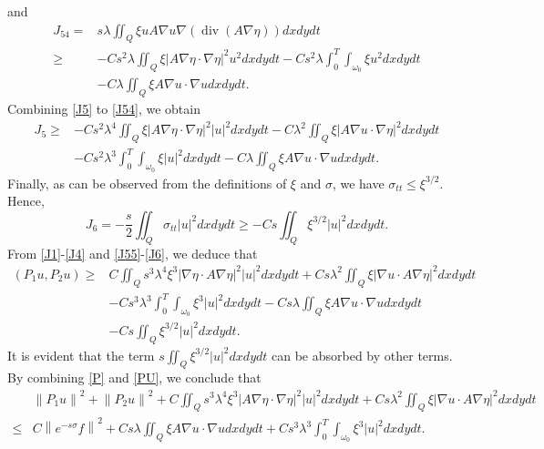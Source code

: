 \documentclass[9pt,reqno]{amsart}
\theoremstyle{plain}
\numberwithin{equation}{section}
\numberwithin{theorem}{section}
\DeclareMathOperator*{\Div}{\mathrm{div}}
\begin{document}
	and
	\begin{equation}\label{J54}
		\begin{split}
			J_{54}=&s \lambda \iint_Q \xi u A \nabla u \nabla(\Div(A \nabla \eta))dx dy d t\\
			\ge&
			-C s^2 \lambda \iint_Q \xi \left|A \nabla \eta \cdot \nabla \eta\right|^2 u^2dx dy d t-C s^2 \lambda \int_0^T \int_{\omega_0}\xi  u^2dx dy d t\\
			&-C \lambda \iint_Q \xi A \nabla u \cdot \nabla udx dy d t.
		\end{split}
	\end{equation}
	Combining \eqref{J5} to \eqref{J54}, we obtain
	\begin{equation}\label{J55}
		\begin{split}
			J_5 \geq&-Cs^2 \lambda^4 \iint_Q \xi\left|A \nabla \eta \cdot \nabla \eta\right|^2 |u|^2dx dy d t -C\lambda^2\iint_{Q} \xi \left| A\nabla u\cdot \nabla \eta \right| ^2 dx dy dt\\
			&-C s^2 \lambda^3 \int_0^T \int_{\omega_0} \xi|u|^2dx dy d t- C\lambda \iint_Q  \xi A \nabla u \cdot \nabla u dx dy d t.
		\end{split}
	\end{equation}
	Finally, as can be observed from the definitions of $\xi$ and $\sigma$, we have $\sigma_{tt} \le \xi^{3/2}$. Hence,
	\begin{equation}\label{J6}
		J_6 =-\frac{s}{2} \iint_Q \sigma_{t t}|u|^2dx dy d t \geq-C s \iint_Q \xi^{3 / 2}|u|^2dx dy d t.
	\end{equation}
	From \eqref{J1}-\eqref{J4} and \eqref{J55}-\eqref{J6}, we deduce that
	\begin{equation}\label{PU}
		\begin{split}
			\left(P_1 u, P_2 u\right)
			\geq& C\iint_Q s^3 \lambda^4 \xi^3 |\nabla \eta \cdot A \nabla \eta|^2 |u|^2 dx dydt  + C s  \lambda^2 \iint_Q\xi|\nabla u \cdot A \nabla \eta|^2 dx dy d t\\
			&-Cs^3 \lambda^3 \int_0^T \int_{\omega_0} \xi^3|u|^2dx dy d t
			- Cs \lambda \iint_Q \xi A \nabla u \cdot \nabla udx dy d t\\
			&- Cs \iint_Q \xi^{3 / 2}|u|^2dx dy d t.
		\end{split}
	\end{equation}
	It is evident that the term $s \iint_Q \xi^{3 / 2}|u|^2dx dy dt$ can be absorbed by other terms. By combining \eqref{P} and \eqref{PU}, we conclude that
	\begin{equation}\label{LU2}
		\begin{split}
			&\left\|P_1 u\right\|^2+\left\|P_2 u\right\|^2+C\iint_Q s^3 \lambda^4 \xi^3\left|A \nabla \eta \cdot \nabla \eta \right|^2|u|^2 dx dydt  + C s  \lambda^2 \iint_Q\xi|\nabla u \cdot A \nabla \eta|^2 dx dy d t\\
			\leq& C\left\|e^{-s \sigma} f\right\|^2
			+Cs \lambda \iint_Q \xi A \nabla u \cdot \nabla udx dy d t+Cs^3 \lambda^3 \int_0^T \int_{\omega_0} \xi^3|u|^2dx dy d t.
		\end{split}
	\end{equation}
\end{document}

